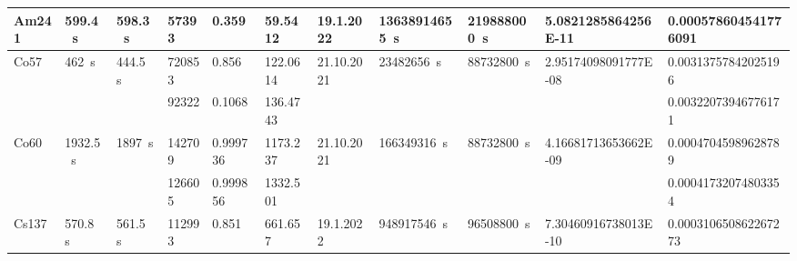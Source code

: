 \documentclass[12pt,a4paper]{article}
\begin{document}
\begin{spacing}{1.5}
\begin{landscape}
\begin{table}
\begin{tabular}{l|l|l|l|l|l|l|l|l|l|l}
		Am241                 & \SI{599.4}{\second}                  & \SI{598.3}{\second}                  & \num{57393}   & \num{0.359}    & \num{59.5412}      				  & 19.1.2022                   & \SI{13638914655}{\second}                & \SI{219888000}{\second}                 & \num{5.0821285864256E-11}                   & \num{0.000578604541776091}  \\ \hline
		\multirow{2}{*}{Co57} & \multirow{2}{*}{\SI{462}{\second}}   & \multirow{2}{*}{\SI{444.5}{\second}}& \num{720853}   & \num{0.856}    & \num{122.0614}     				  & \multirow{2}{*}{21.10.2021} & \multirow{2}{*}{\SI{23482656}{\second}}  & \multirow{2}{*}{\SI{88732800}{\second}} & \multirow{2}{*}{\num{2.95174098091777E-08}} & \num{0.00313757842025196}  \\  
		&                         			   						 &                         				& \num{92322}   & \num{0.1068}   & \num{136.4743}     				  &                             &                            				&                           			  &                                       		& \num{0.00322073946776171}  \\ \hline
		\multirow{2}{*}{Co60} & \multirow{2}{*}{\SI{1932.5}{\second}}& \multirow{2}{*}{\SI{1897}{\second}}  & \num{142709}  & \num{0.999736} & \num{1173.237}     				  & \multirow{2}{*}{21.10.2021} & \multirow{2}{*}{\SI{166349316}{\second}} & \multirow{2}{*}{\SI{88732800}{\second}} & \multirow{2}{*}{\num{4.16681713653662E-09}} & \num{0.00047045989628789}  \\  
		&                          			   						 &                          			& \num{126605}  & \num{0.999856} & \num{1332.501}    					  &                             &                            				&                           			  &                                       	& \num{0.00041732074803354}  \\ \hline
		Cs137                 & \SI{570.8}{\second}                  & \SI{561.5}{\second}                  & \num{112993}  & \num{0.851}    & \num{661.657}      				  & 19.1.2022                   & \SI{948917546}{\second}                  & \SI{96508800}{\second}                  & \num{7.30460916738013E-10}                  & \num{0.000310650862267273}  \\ \hline
	\end{tabular}
\end{table}
\end{landscape}
\begin{landscape}


\end{landscape}
\end{spacing}
\end{document}
